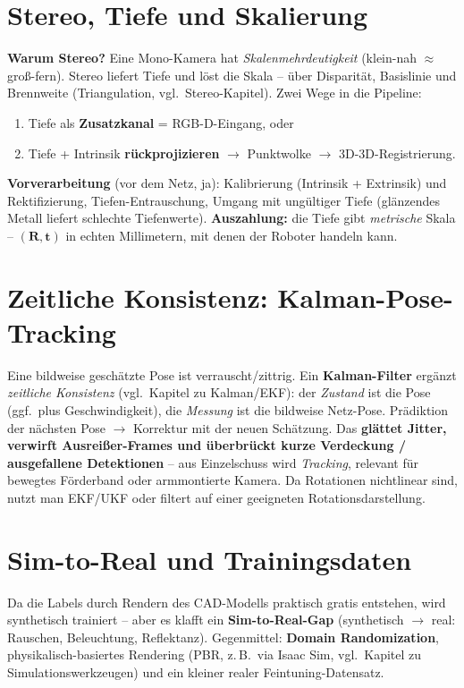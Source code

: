 \section{Stereo, Tiefe und Skalierung}
\textbf{Warum Stereo?} Eine Mono-Kamera hat \emph{Skalenmehrdeutigkeit}
(klein-nah $\approx$ groß-fern). Stereo liefert Tiefe und löst die Skala -- über
Disparität, Basislinie und Brennweite (Triangulation, vgl.\ Stereo-Kapitel).
Zwei Wege in die Pipeline:
\begin{enumerate}[label=(\alph*)]
\item Tiefe als \textbf{Zusatzkanal} = RGB-D-Eingang, oder
\item Tiefe + Intrinsik \textbf{rückprojizieren} $\rightarrow$ Punktwolke
  $\rightarrow$ 3D-3D-Registrierung.
\end{enumerate}
\textbf{Vorverarbeitung} (vor dem Netz, ja): Kalibrierung (Intrinsik +
Extrinsik) und Rektifizierung, Tiefen-Entrauschung, Umgang mit ungültiger Tiefe
(glänzendes Metall liefert schlechte Tiefenwerte). \textbf{Auszahlung:} die
Tiefe gibt \emph{metrische} Skala -- $(\bm{R},\bm{t})$ in echten Millimetern, mit
denen der Roboter handeln kann.

\section{Zeitliche Konsistenz: Kalman-Pose-Tracking}
Eine bildweise geschätzte Pose ist verrauscht/zittrig. Ein \textbf{Kalman-Filter}
ergänzt \emph{zeitliche Konsistenz} (vgl.\ Kapitel zu Kalman/EKF): der
\emph{Zustand} ist die Pose (ggf.\ plus Geschwindigkeit), die \emph{Messung} ist
die bildweise Netz-Pose. Prädiktion der nächsten Pose $\rightarrow$ Korrektur mit
der neuen Schätzung. Das \textbf{glättet Jitter, verwirft Ausreißer-Frames und
überbrückt kurze Verdeckung / ausgefallene Detektionen} -- aus Einzelschuss wird
\emph{Tracking}, relevant für bewegtes Förderband oder armmontierte Kamera. Da
Rotationen nichtlinear sind, nutzt man EKF/UKF oder filtert auf einer geeigneten
Rotationsdarstellung.

\section{Sim-to-Real und Trainingsdaten}
Da die Labels durch Rendern des CAD-Modells praktisch gratis entstehen, wird
synthetisch trainiert -- aber es klafft ein \textbf{Sim-to-Real-Gap}
(synthetisch $\rightarrow$ real: Rauschen, Beleuchtung, Reflektanz). Gegenmittel:
\textbf{Domain Randomization}, physikalisch-basiertes Rendering (PBR, z.\,B.\ via
Isaac Sim, vgl.\ Kapitel zu Simulationswerkzeugen) und ein kleiner realer
Feintuning-Datensatz.

